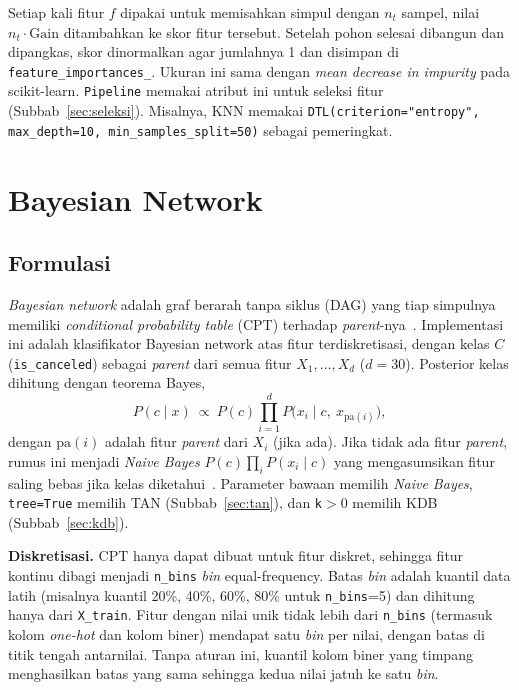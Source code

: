 Setiap kali fitur $f$ dipakai untuk memisahkan simpul dengan $n_t$ sampel,
nilai $n_t\cdot\text{Gain}$ ditambahkan ke skor fitur tersebut. Setelah pohon
selesai dibangun dan dipangkas, skor dinormalkan agar jumlahnya 1 dan disimpan di
\texttt{feature\_importances\_}. Ukuran ini sama dengan \textit{mean decrease in
impurity} pada scikit-learn. \texttt{Pipeline} memakai atribut ini untuk seleksi
fitur (Subbab~\ref{sec:seleksi}). Misalnya, KNN memakai
\texttt{DTL(criterion="entropy", max\_depth=10, min\_samples\_split=50)} sebagai
pemeringkat.

\section{Bayesian Network}
\label{sec:bn}

\subsection{Formulasi}

\textit{Bayesian network} adalah graf berarah tanpa siklus (DAG) yang tiap
simpulnya memiliki \textit{conditional probability table} (CPT) terhadap
\textit{parent}-nya~\cite{kkif2026bayesnet}. Implementasi ini adalah klasifikator Bayesian network atas
fitur terdiskretisasi, dengan kelas $C$ (\texttt{is\_canceled}) sebagai
\textit{parent} dari semua fitur $X_1,\dots,X_d$ ($d=30$). Posterior kelas
dihitung dengan teorema Bayes,
\begin{equation}
	P(c\mid x)\ \propto\ P(c)\prod_{i=1}^{d}P\bigl(x_i\mid c,\ x_{\mathrm{pa}(i)}\bigr),
\end{equation}
dengan $\mathrm{pa}(i)$ adalah fitur \textit{parent} dari $X_i$ (jika ada).
Jika tidak ada fitur \textit{parent}, rumus ini menjadi \textit{Naive Bayes}
$P(c)\prod_i P(x_i\mid c)$ yang mengasumsikan fitur saling bebas jika kelas
diketahui~\cite{kkif2026bayesnet}. Parameter bawaan memilih \textit{Naive Bayes},
\texttt{tree=True} memilih TAN (Subbab~\ref{sec:tan}), dan \texttt{k}$>0$
memilih KDB (Subbab~\ref{sec:kdb}).

\textbf{Diskretisasi.} CPT hanya dapat dibuat untuk fitur diskret, sehingga
fitur kontinu dibagi menjadi \texttt{n\_bins} \textit{bin} equal-frequency. Batas
\textit{bin} adalah kuantil data latih (misalnya kuantil 20\%, 40\%, 60\%, 80\%
untuk \texttt{n\_bins}=5) dan dihitung hanya dari \texttt{X\_train}. Fitur dengan
nilai unik tidak lebih dari \texttt{n\_bins} (termasuk kolom \textit{one-hot}
dan kolom biner) mendapat satu \textit{bin} per nilai, dengan batas di titik
tengah antarnilai. Tanpa aturan ini, kuantil kolom biner yang timpang
menghasilkan batas yang sama sehingga kedua nilai jatuh ke satu \textit{bin}.

